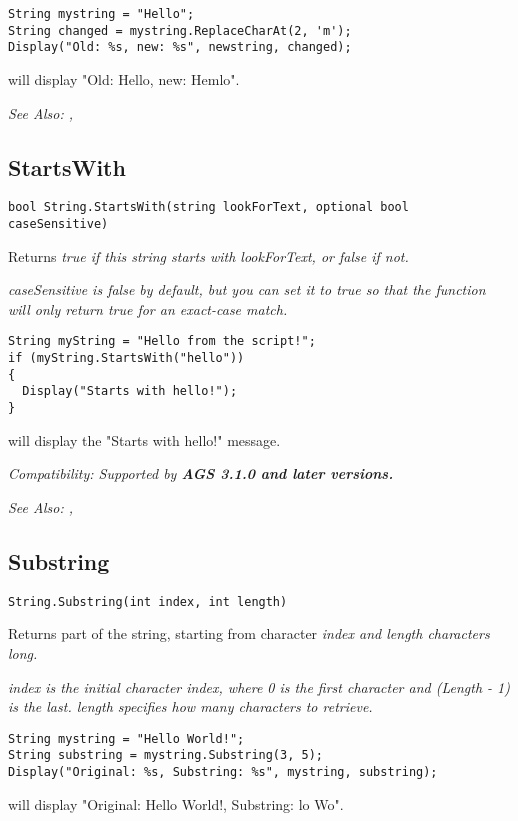 \begin{verbatim}
String mystring = "Hello";
String changed = mystring.ReplaceCharAt(2, 'm');
Display("Old: %s, new: %s", newstring, changed);
\end{verbatim}
will display "Old: Hello, new: Hemlo".

\it{See Also:} ,


\subsection{StartsWith}\label{String.StartsWith}%

\begin{verbatim}
bool String.StartsWith(string lookForText, optional bool caseSensitive)
\end{verbatim}
Returns \it{true} if this string starts with \it{lookForText}, or \it{false} if not.

\it{caseSensitive} is \it{false} by default, but you can set it to true so that the
function will only return \it{true} for an exact-case match.

\begin{verbatim}
String myString = "Hello from the script!";
if (myString.StartsWith("hello"))
{
  Display("Starts with hello!");
}
\end{verbatim}
will display the "Starts with hello!" message.

\it{Compatibility:} Supported by \bf{AGS 3.1.0} and later versions.

\it{See Also:} ,


\subsection{Substring}\label{String.Substring}%

\begin{verbatim}
String.Substring(int index, int length)
\end{verbatim}
Returns part of the string, starting from character \it{index} and \it{length}
characters long.

\it{index} is the initial character index, where 0 is the first character and
(Length - 1) is the last. \it{length} specifies how many characters to retrieve.

\begin{verbatim}
String mystring = "Hello World!";
String substring = mystring.Substring(3, 5);
Display("Original: %s, Substring: %s", mystring, substring);
\end{verbatim}
will display "Original: Hello World!, Substring: lo Wo".

